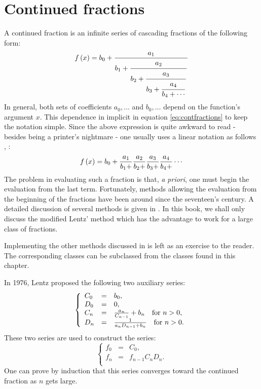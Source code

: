 \documentclass[twoside]{book}
\begin{document}
\section{Continued fractions}
\label{sec:contfractions}
A continued fraction is an infinite
series of cascading fractions of the following form:
\begin{equation}
\label{eq:contfractions}
  f\left( x\right)=b_0+{a_1 \over\displaystyle b_1+
  {\strut a_2 \over\displaystyle b_2+{\strut a_3 \over\displaystyle b_3+
  {\strut a_4 \over\displaystyle b_4+\cdots}}}}
\end{equation}
In general, both sets of coefficients $a_0,\ldots$ and
$b_0,\ldots$ depend on the function's argument $x$. This
dependence in implicit in equation \ref{eq:contfractions} to keep
the notation simple. Since the above expression is quite awkward
to read - besides being a printer's nightmare - one usually uses a
linear notation as follows \cite{AbrSteg}, \cite{Press}:
\begin{equation}
\label{eq:contfractionsline}
  f\left( x\right)=b_0+{a_1 \over b_1+}{a_2 \over b_2+}{a_3 \over b_3+}{a_4 \over
  b_4+}\cdots
\end{equation}
The problem in evaluating such a fraction is that, {\it a priori},
one must begin the evaluation from the last term. Fortunately,
methods allowing the evaluation from the beginning of the
fractions have been around since the seventeen's century. A
detailed discussion of several methods is given in \cite{Press}.
In this book, we shall only discuss the modified Lentz' method
which has the advantage to work for a large class of fractions.

Implementing the other methods discussed in \cite{Press} is left
as an exercise to the reader. The corresponding classes can be
subclassed from the classes found in this chapter.

In 1976, Lentz proposed the following two auxiliary series:
\begin{equation}
  \left\{{
  \begin{array}{lcl}
    C_0 & = & b_0,\\
    D_0 & = & 0, \\
    C_n & = & {a_n \over C_{n-1}}+b_n\mbox{\quad for $n>0$}, \\
    D_n & = & {1 \over a_n D_{n-1}+b_n}\mbox{\quad for $n>0$}.
  \end{array}
  }\right.
\end{equation}
These two series are used to construct the series:
\begin{equation}
  \left\{{
  \begin{array}{lcl}
    f_0 & = & C_0,\\
    f_n & = & f_{n-1}C_n D_n. \\
  \end{array}
  }\right.
\end{equation}
One can prove by induction that this series converges toward the
continued fraction as $n$ gets large.
\end{document}

